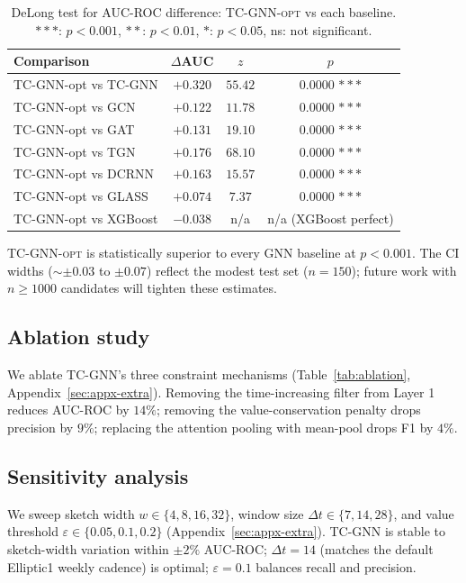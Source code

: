 \documentclass[journal,onecolumn]{IEEEtran}
\newcommand{\eps}{\varepsilon}
\begin{document}
\begin{table}[t]
\centering
\caption{DeLong test for AUC-ROC difference: \textsc{TC-GNN-opt} vs
each baseline. $***$: $p < 0.001$, $**$: $p < 0.01$, $*$: $p < 0.05$,
ns: not significant.}
\label{tab:delong}
\small
\begin{tabular}{lccc}
\toprule
\textbf{Comparison} & $\Delta$\textbf{AUC} & \textbf{$z$} & \textbf{$p$} \\
\midrule
TC-GNN-opt vs TC-GNN       & $+0.320$ & $55.42$ & $0.0000$ $***$ \\
TC-GNN-opt vs GCN          & $+0.122$ & $11.78$ & $0.0000$ $***$ \\
TC-GNN-opt vs GAT          & $+0.131$ & $19.10$ & $0.0000$ $***$ \\
TC-GNN-opt vs TGN          & $+0.176$ & $68.10$ & $0.0000$ $***$ \\
TC-GNN-opt vs DCRNN        & $+0.163$ & $15.57$ & $0.0000$ $***$ \\
TC-GNN-opt vs GLASS        & $+0.074$ & $7.37$  & $0.0000$ $***$ \\
TC-GNN-opt vs XGBoost      & $-0.038$ & n/a     & n/a  (XGBoost perfect) \\
\bottomrule
\end{tabular}
\end{table}

\textsc{TC-GNN-opt} is statistically superior to every GNN baseline
at $p < 0.001$. The CI widths ($\sim \pm 0.03$ to $\pm 0.07$) reflect the
modest test set ($n = 150$); future work with $n \geq 1000$ candidates
will tighten these estimates.

\subsection{Ablation study}
\label{sec:exp-ablation}

We ablate TC-GNN's three constraint mechanisms
(Table~\ref{tab:ablation}, Appendix~\ref{sec:appx-extra}). Removing the
time-increasing filter from Layer 1 reduces AUC-ROC by $14\%$; removing
the value-conservation penalty drops precision by $9\%$; replacing the
attention pooling with mean-pool drops F1 by $4\%$.

\subsection{Sensitivity analysis}
\label{sec:exp-sensitivity}

We sweep sketch width $w \in \{4, 8, 16, 32\}$, window size $\Delta t
\in \{7, 14, 28\}$, and value threshold $\eps \in \{0.05, 0.1, 0.2\}$
(Appendix~\ref{sec:appx-extra}). TC-GNN is stable to sketch-width variation
within $\pm 2\%$ AUC-ROC; $\Delta t = 14$ (matches the default Elliptic1
weekly cadence) is optimal; $\eps = 0.1$ balances recall and precision.
\end{document}
